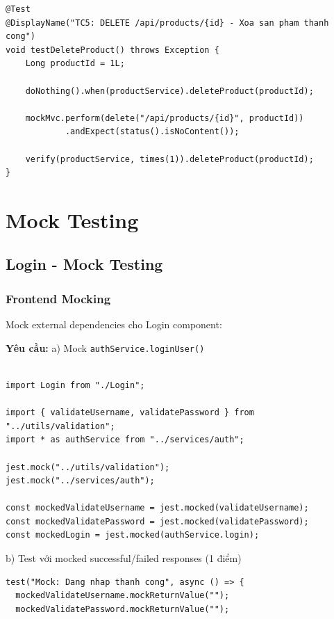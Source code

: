 \documentclass[a4paper,12pt]{article}
\begin{document}
{\begin{tcolorbox}[breakable, colback=green!5,colframe=black!50,title=Delete Product Tests ]
\begin{lstlisting}
@Test
@DisplayName("TC5: DELETE /api/products/{id} - Xoa san pham thanh cong")
void testDeleteProduct() throws Exception {
    Long productId = 1L;

    doNothing().when(productService).deleteProduct(productId);

    mockMvc.perform(delete("/api/products/{id}", productId))
            .andExpect(status().isNoContent());

    verify(productService, times(1)).deleteProduct(productId);
}

\end{lstlisting}
\end{tcolorbox}
\section{ Mock Testing}

\subsection{Login - Mock Testing}

\subsubsection{Frontend Mocking }

Mock external dependencies cho Login component:

\textbf{Yêu cầu:}
a) Mock \texttt{authService.loginUser()}
\begin{tcolorbox}[breakable, colback=green!5,colframe=black!50,title=Mock authService.loginUser() ]
\begin{lstlisting}

import Login from "./Login";

import { validateUsername, validatePassword } from "../utils/validation";
import * as authService from "../services/auth";

jest.mock("../utils/validation");
jest.mock("../services/auth");

const mockedValidateUsername = jest.mocked(validateUsername);
const mockedValidatePassword = jest.mocked(validatePassword);
const mockedLogin = jest.mocked(authService.login);
\end{lstlisting}
\end{tcolorbox}
b) Test với mocked successful/failed responses (1 điểm)
\begin{tcolorbox}[breakable, colback=green!5,colframe=black!50,title=Test Với Mocked Successful/Failed Responses ]
\begin{lstlisting}
test("Mock: Dang nhap thanh cong", async () => {
  mockedValidateUsername.mockReturnValue("");
  mockedValidatePassword.mockReturnValue("");


\end{lstlisting}
\end{tcolorbox}}
\end{document}
